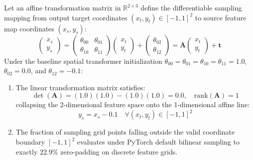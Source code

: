 \begin{theorem}
\label{thm:singular_grid}
\label{thm:singular_grid_collapse}
Let an affine transformation matrix in $\mathbb{R}^{2 \times 3}$ define the differentiable sampling mapping from output target coordinates $(x_t, y_t) \in [-1, 1]^2$ to source feature map coordinates $(x_s, y_s)$:
\begin{equation}
    \begin{pmatrix} x_s \\ y_s \end{pmatrix} = \begin{pmatrix} \theta_{00} & \theta_{01} \\ \theta_{10} & \theta_{11} \end{pmatrix} \begin{pmatrix} x_t \\ y_t \end{pmatrix} + \begin{pmatrix} \theta_{02} \\ \theta_{12} \end{pmatrix} = \mathbf{A} \begin{pmatrix} x_t \\ y_t \end{pmatrix} + \mathbf{t}
\end{equation}
Under the baseline spatial transformer initialization $\theta_{00} = \theta_{01} = \theta_{10} = \theta_{11} = 1.0$, $\theta_{02} = 0.0$, and $\theta_{12} = -0.1$:
\begin{enumerate}
    \item The linear transformation matrix satisfies:
    \begin{equation}
        \det(\mathbf{A}) = (1.0)(1.0) - (1.0)(1.0) = 0.0, \quad \mathrm{rank}(\mathbf{A}) = 1
    \end{equation}
    collapsing the 2-dimensional feature space onto the 1-dimensional affine line:
    \begin{equation}
        y_s = x_s - 0.1 \quad \forall (x_t, y_t) \in [-1, 1]^2
    \end{equation}
    \item The fraction of sampling grid points falling outside the valid coordinate boundary $[-1, 1]^2$ evaluates under PyTorch default bilinear sampling to exactly $22.9\%$ zero-padding on discrete feature grids.
\end{enumerate}
\end{theorem}

